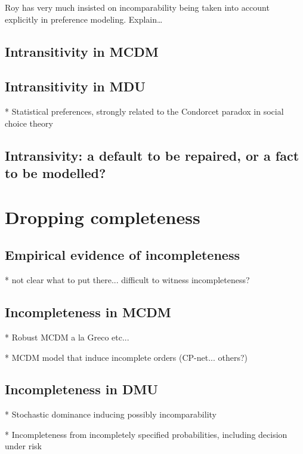 \documentclass[french, english]{llncs}
\begin{document}
Roy has very much insisted on incomparability being taken into account explicitly in preference modeling. Explain…

\subsection{Intransitivity in MCDM}

\subsection{Intransitivity in MDU}

* Statistical preferences, strongly related to the Condorcet paradox in social choice theory

\subsection{Intransivity: a default to be repaired, or a fact to be modelled?}

\section{Dropping completeness}

\subsection{Empirical evidence of incompleteness}

* not clear what to put there... difficult to witness incompleteness? 

\subsection{Incompleteness in MCDM}

* Robust MCDM a la Greco etc...

* MCDM model that induce incomplete orders (CP-net... others?)

\subsection{Incompleteness in DMU}

* Stochastic dominance inducing possibly incomparability

* Incompleteness from incompletely specified probabilities, including decision under risk
\end{document}

